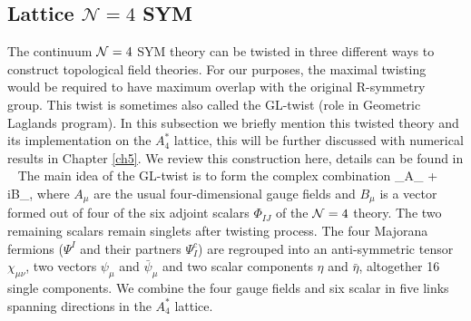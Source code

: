 \subsection{\label{sec:latticeN4}Lattice  $\mathcal{N} = 4$ SYM}
The continuum $\mathcal N = 4$ SYM theory can be twisted in three different ways to construct topological field theories.
For our purposes, the maximal twisting ~\cite{Marcus:1995mq} would be required to have maximum overlap with the original 
R-symmetry group. This twist is sometimes also called the GL-twist (role in Geometric Laglands program). 
In this subsection we briefly mention this twisted theory and its implementation on the $A_4^*$ lattice, this will be 
further discussed with numerical results in Chapter \ref{ch5}. 
We review this construction here, details can be found in ~\cite{Kaplan:2005ta, Catterall:2009it}
The main idea of the GL-twist is to form the complex combination
\beq
  \label{4dgauge}
  \cA_\mu \equiv A_{\mu} + iB_{\mu},
\eeq
where $A_{\mu}$ are the usual four-dimensional gauge fields and $B_{\mu}$ is a vector formed out of four of the six adjoint scalars $\Phi_{IJ}$ of the $\mathcal N = 4$ theory.
The two remaining scalars remain singlets after twisting process.
The four Majorana fermions ($\Psi^I$ and their partners $\Psi^c_I$) are regrouped into an anti-symmetric tensor $\chi_{\mu\nu}$, 
two vectors $\psi_\mu$ and $\bar{\psi}_{\mu}$ and two scalar components $\eta$ and $\bar{\eta}$, altogether 16 single components.
We combine the four gauge fields and six scalar in five links spanning directions in the $A_{4}^{*}$ lattice. 

